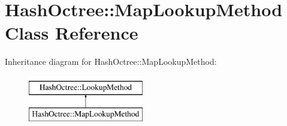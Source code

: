 \hypertarget{class_hash_octree_1_1_map_lookup_method}{}\section{Hash\+Octree\+::Map\+Lookup\+Method Class Reference}
\label{class_hash_octree_1_1_map_lookup_method}
Inheritance diagram for Hash\+Octree\+::Map\+Lookup\+Method\+:\begin{figure}[H]
\begin{center}
\leavevmode
\includegraphics[height=2.000000cm]{class_hash_octree_1_1_map_lookup_method}
\end{center}
\end{figure}
